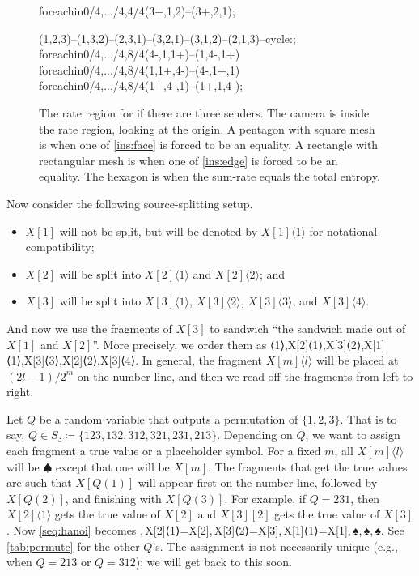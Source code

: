 \documentclass[openany]{amsbook}
\numberwithin{equation}{chapter}
\numberwithin{figure}{chapter}
\numberwithin{table}{chapter}
\def\[#1\]{\begin{equation*}{#1}\end{equation*}}
\theoremstyle{definition}	理dfn:Definition~?s			理exa:Example~?s
\theoremstyle{remark}		理cla:Claim~?s				理rem:Remark~?s
\begin{document}
\begin{figure}
{\begin{scope}
						foreach\x in{0/4,.../4,4/4}{(3+\x,1,2)--(3+\x,2,1)};
			\end{scope}
			\begin{scope}
				\face	(1,2,3)--(1,3,2)--(2,3,1)--(3,2,1)--(3,1,2)--(2,1,3)--cycle:;
				\mesh	foreach\z in{0/4,.../4,8/4}{(4-\z,1,1+\z)--(1,4-\z,1+\z)}
						foreach\y in{0/4,.../4,8/4}{(1,1+\y,4-\y)--(4-\y,1+\y,1)}
						foreach\x in{0/4,.../4,8/4}{(1+\x,4-\x,1)--(1+\x,1,4-\x)};
			\end{scope}
		}
		\caption{
			The rate region for if there are three senders.
			The camera is inside the rate region, looking at the origin.
			A pentagon with square mesh is when
			one of \cref{ins:face} is forced to be an equality.
			A rectangle with rectangular mesh is when
			one of \cref{ins:edge} is forced to be an equality.
			The hexagon is when the sum-rate equals the total entropy.
		}\label{fig:truncate}
	\end{figure}
	
	Now consider the following source-splitting setup.
	\begin{itemize}
		\item	$X[1]$ will not be split, but will be denoted by
				$X[1]⟨1⟩$ for notational compatibility;
		\item	$X[2]$ will be split into $X[2]⟨1⟩$ and $X[2]⟨2⟩$; and
		\item	$X[3]$ will be split into
				$X[3]⟨1⟩$, $X[3]⟨2⟩$, $X[3]⟨3⟩$, and $X[3]⟨4⟩$.
	\end{itemize}
	And now we use the fragments of $X[3]$ to sandwich
	“the sandwich made out of $X[1]$ and $X[2]$”.
	More precisely, we order them as
	\[X[3]⟨1⟩,X[2]⟨1⟩,X[3]⟨2⟩,X[1]⟨1⟩,X[3]⟨3⟩,X[2]⟨2⟩,X[3]⟨4⟩.\label{seq:hanoi}\]
	In general, the fragment $X[m]⟨l⟩$ will be placed at $(2l-1)/2^m$
	on the number line, and then we read off the fragments from left to right.
	
	Let $Q$ be a random variable that outputs a permutation of $\{1,2,3\}$.
	That is to say, $Q∈S₃≔\{123,132,312,321,231,213\}$.
	Depending on $Q$, we want to assign each fragment
	a true value or a placeholder symbol.
	For a fixed $m$, all $X[m]⟨l⟩$ will be $♠$ except that one will be $X[m]$.
	The fragments that get the true values are such that $X[Q(1)]$ will appear first
	on the number line, followed by $X[Q(2)]$, and finishing with $X[Q(3)]$.
	For example, if $Q=231$, then $X[2]⟨1⟩$ gets the true value of $X[2]$
	and $X[3][2]$ gets the true value of $X[3]$.
	Now \cref{seq:hanoi} becomes
	\[♠,\,X[2]⟨1⟩=X[2],\,X[3]⟨2⟩=X[3],\,X[1]⟨1⟩=X[1],\,♠,\,♠,\,♠.\]
	See \cref{tab:permute} for the other $Q$'s.
	The assignment is not necessarily unique (e.g., when $Q=213$ or $Q=312$);
	we will get back to this soon.
	
\end{document}
